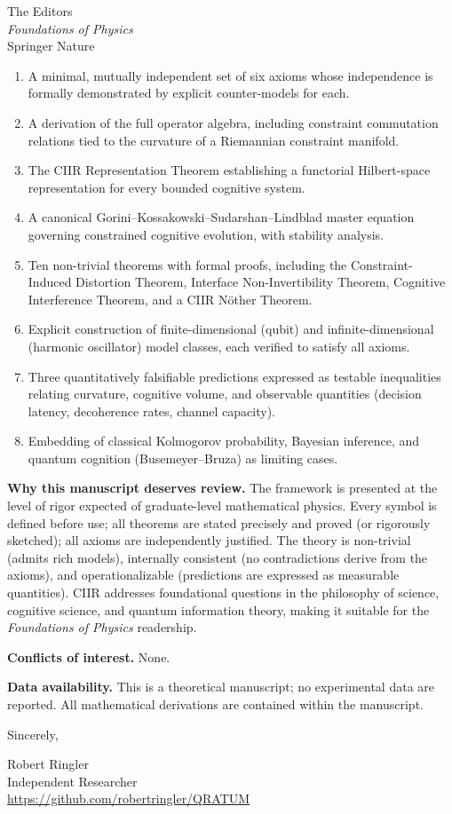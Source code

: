 \documentclass[12pt]{letter}
\begin{document}
\begin{letter}{The Editors\\
\textit{Foundations of Physics}\\
Springer Nature}
\begin{enumerate}
\item A minimal, mutually independent set of six axioms whose independence is
      formally demonstrated by explicit counter-models for each.
\item A derivation of the full operator algebra, including constraint
      commutation relations tied to the curvature of a Riemannian constraint
      manifold.
\item The CIIR Representation Theorem establishing a functorial Hilbert-space
      representation for every bounded cognitive system.
\item A canonical Gorini--Kossakowski--Sudarshan--Lindblad master equation
      governing constrained cognitive evolution, with stability analysis.
\item Ten non-trivial theorems with formal proofs, including the
      Constraint-Induced Distortion Theorem, Interface Non-Invertibility
      Theorem, Cognitive Interference Theorem, and a CIIR N\"{o}ther Theorem.
\item Explicit construction of finite-dimensional (qubit) and
      infinite-dimensional (harmonic oscillator) model classes, each verified
      to satisfy all axioms.
\item Three quantitatively falsifiable predictions expressed as testable
      inequalities relating curvature, cognitive volume, and observable
      quantities (decision latency, decoherence rates, channel capacity).
\item Embedding of classical Kolmogorov probability, Bayesian inference, and
      quantum cognition (Busemeyer--Bruza) as limiting cases.
\end{enumerate}

\textbf{Why this manuscript deserves review.}
The framework is presented at the level of rigor expected of graduate-level
mathematical physics.  Every symbol is defined before use; all theorems are
stated precisely and proved (or rigorously sketched); all axioms are
independently justified.  The theory is non-trivial (admits rich models),
internally consistent (no contradictions derive from the axioms), and
operationalizable (predictions are expressed as measurable quantities).
CIIR addresses foundational questions in the philosophy of science, cognitive
science, and quantum information theory, making it suitable for the
\textit{Foundations of Physics} readership.

\textbf{Conflicts of interest.}
None.

\textbf{Data availability.}
This is a theoretical manuscript; no experimental data are reported.  All
mathematical derivations are contained within the manuscript.

\closing{Sincerely,}

Robert Ringler\\
Independent Researcher\\
\href{https://github.com/robertringler/QRATUM}{https://github.com/robertringler/QRATUM}

\end{letter}
\end{document}
